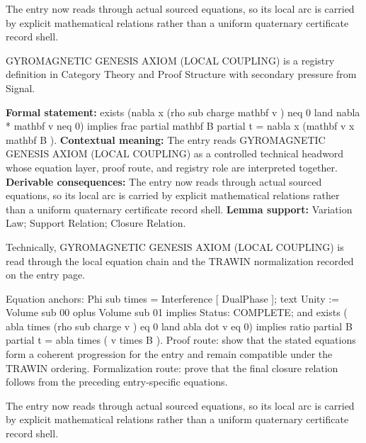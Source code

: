 The entry now reads through actual sourced equations, so its local arc is carried by explicit mathematical relations rather than a uniform quaternary certificate record shell.
\clearpage


\begingroup\small
{}
GYROMAGNETIC GENESIS AXIOM (LOCAL COUPLING) is a registry definition in Category Theory and Proof Structure with secondary pressure from Signal.

\begingroup\footnotesize\setlength{\emergencystretch}{3em}\sloppy
\textbf{Formal statement:} exists (nabla x (rho sub charge mathbf v ) neq 0 land nabla * mathbf v neq 0) implies frac partial mathbf B partial t = nabla x (mathbf v x mathbf B ). \textbf{Contextual meaning:} The entry reads GYROMAGNETIC GENESIS AXIOM (LOCAL COUPLING) as a controlled technical headword whose equation layer, proof route, and registry role are interpreted together. \textbf{Derivable consequences:} The entry now reads through actual sourced equations, so its local arc is carried by explicit mathematical relations rather than a uniform quaternary certificate record shell. \textbf{Lemma support:} Variation Law; Support Relation; Closure Relation.\par
\endgroup

Technically, GYROMAGNETIC GENESIS AXIOM (LOCAL COUPLING) is read through the local equation chain and the TRAWIN normalization recorded on the entry page.

Equation anchors: Phi sub times = Interference [ DualPhase ]; text Unity := Volume sub 00 oplus Volume sub 01 implies Status: COMPLETE; and exists ( abla times (rho sub charge v ) eq 0 land abla dot v eq 0) implies ratio partial B partial t = abla times ( v times B ). Proof route: show that the stated equations form a coherent progression for the entry and remain compatible under the TRAWIN ordering. Formalization route: prove that the final closure relation follows from the preceding entry-specific equations.

The entry now reads through actual sourced equations, so its local arc is carried by explicit mathematical relations rather than a uniform quaternary certificate record shell.
\endgroup

